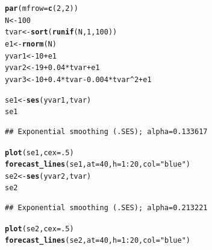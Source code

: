 \documentclass[10pt]{article}\usepackage[]{graphicx}\usepackage[]{color}
\makeatletter
\newcommand{\hlnum}[1]{\textcolor[rgb]{0.686,0.059,0.569}{#1}}%
\newcommand{\hlstr}[1]{\textcolor[rgb]{0.192,0.494,0.8}{#1}}%
\newcommand{\hlopt}[1]{\textcolor[rgb]{0,0,0}{#1}}%
\newcommand{\hlstd}[1]{\textcolor[rgb]{0.345,0.345,0.345}{#1}}%
\newcommand{\hlkwb}[1]{\textcolor[rgb]{0.69,0.353,0.396}{#1}}%
\newcommand{\hlkwc}[1]{\textcolor[rgb]{0.333,0.667,0.333}{#1}}%
\newcommand{\hlkwd}[1]{\textcolor[rgb]{0.737,0.353,0.396}{\textbf{#1}}}%
\newenvironment{kframe}{%
 \def\at@end@of@kframe{}%
 \ifinner\ifhmode%
  \def\at@end@of@kframe{\end{minipage}}%
  \begin{minipage}{\columnwidth}%
 \fi\fi%
 \def\FrameCommand##1{\hskip\@totalleftmargin \hskip-\fboxsep
 \colorbox{shadecolor}{##1}\hskip-\fboxsep
     \hskip-\linewidth \hskip-\@totalleftmargin \hskip\columnwidth}%
 \MakeFramed {\advance\hsize-\width
   \@totalleftmargin\z@ \linewidth\hsize
   \@setminipage}}%
 {\par\unskip\endMakeFramed%
 \at@end@of@kframe}
\newenvironment{knitrout}{}{} %
\makeatother
\begin{document}
\begin{knitrout}
\color{fgcolor}\begin{kframe}
\begin{alltt}
\hlkwd{par}\hlstd{(}\hlkwc{mfrow}\hlstd{=}\hlkwd{c}\hlstd{(}\hlnum{2}\hlstd{,}\hlnum{2}\hlstd{))}
\hlstd{N} \hlkwb{<-} \hlnum{100}
\hlstd{tvar} \hlkwb{<-} \hlkwd{sort}\hlstd{(}\hlkwd{runif}\hlstd{(N,} \hlnum{1}\hlstd{,} \hlnum{100}\hlstd{))}
\hlstd{e1} \hlkwb{<-} \hlkwd{rnorm}\hlstd{(N)}
\hlstd{yvar1} \hlkwb{<-} \hlnum{10} \hlopt{+} \hlstd{e1}
\hlstd{yvar2} \hlkwb{<-} \hlnum{19} \hlopt{+} \hlnum{0.04} \hlopt{*} \hlstd{tvar} \hlopt{+} \hlstd{e1}
\hlstd{yvar3} \hlkwb{<-} \hlnum{10} \hlopt{+} \hlnum{0.4} \hlopt{*} \hlstd{tvar} \hlopt{-} \hlnum{0.004} \hlopt{*} \hlstd{tvar}\hlopt{^}\hlnum{2} \hlopt{+} \hlstd{e1}

\hlstd{se1}  \hlkwb{<-} \hlkwd{ses}\hlstd{(yvar1, tvar)}
\hlstd{se1}
\end{alltt}
\begin{verbatim}
## Exponential smoothing (.SES); alpha=0.133617
\end{verbatim}
\begin{alltt}
\hlkwd{plot}\hlstd{(se1,} \hlkwc{cex}\hlstd{=}\hlnum{.5}\hlstd{)}
\hlkwd{forecast_lines}\hlstd{(se1,} \hlkwc{at}\hlstd{=}\hlnum{40}\hlstd{,} \hlkwc{h}\hlstd{=}\hlnum{1}\hlopt{:}\hlnum{20}\hlstd{,} \hlkwc{col}\hlstd{=}\hlstr{"blue"}\hlstd{)}
\hlstd{se2}  \hlkwb{<-} \hlkwd{ses}\hlstd{(yvar2, tvar)}
\hlstd{se2}
\end{alltt}
\begin{verbatim}
## Exponential smoothing (.SES); alpha=0.213221
\end{verbatim}
\begin{alltt}
\hlkwd{plot}\hlstd{(se2,} \hlkwc{cex}\hlstd{=}\hlnum{.5}\hlstd{)}
\hlkwd{forecast_lines}\hlstd{(se2,} \hlkwc{at}\hlstd{=}\hlnum{40}\hlstd{,} \hlkwc{h}\hlstd{=}\hlnum{1}\hlopt{:}\hlnum{20}\hlstd{,} \hlkwc{col}\hlstd{=}\hlstr{"blue"}\hlstd{)}


\end{alltt}
\end{kframe}
\end{knitrout}
\end{document}
